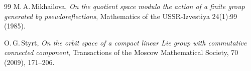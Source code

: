 \documentclass[english, 12pt]{amsproc}
\numberwithin{equation}{section}
\theoremstyle{plain}
\theoremstyle{definition}
\theoremstyle{remark}
\begin{document}
\begin{thebibliography}{99}
    M.\,A.\,Mikhailova, \textit{On the quotient space modulo the action of a finite group generated by pseudoreflections}, Mathematics of the USSR-Izvestiya 24(1):99 (1985).


O.\,G.\,Styrt, \textit{On the orbit space of a compact linear Lie group with commutative connected component}, Transactions of the Moscow Mathematical Society, 70 (2009), 171--206.

\end{thebibliography}
\end{document}
